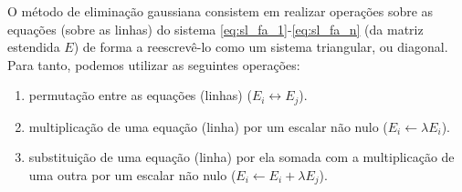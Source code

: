 O método de eliminação gaussiana consistem em realizar operações sobre as equações (sobre as linhas) do sistema \eqref{eq:sl_fa_1}-\eqref{eq:sl_fa_n} (da matriz estendida $E$) de forma a reescrevê-lo como um sistema triangular, ou diagonal. Para tanto, podemos utilizar as seguintes operações:
\begin{enumerate}[1.]
\item permutação entre as equações (linhas) ($E_i \leftrightarrow E_j$).
\item multiplicação de uma equação (linha) por um escalar não nulo ($E_i \leftarrow \lambda E_i$).
\item substituição de uma equação (linha) por ela somada com a multiplicação de uma outra por um escalar não nulo ($E_i \leftarrow E_i + \lambda E_j$).
\end{enumerate}

